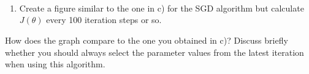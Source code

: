 \documentclass[11pt]{article}
\providecommand{\tightlist}{%
      \setlength{\itemsep}{0pt}\setlength{\parskip}{0pt}}
\begin{document}
    \begin{center}
    \end{center}
    { \hspace*{\fill} \\}
    
    \begin{center}
    \end{center}
    { \hspace*{\fill} \\}
    
    \begin{center}
    \end{center}
    { \hspace*{\fill} \\}
    
    \begin{enumerate}
\def\labelenumi{\alph{enumi})}
\setcounter{enumi}{3}
\tightlist
\item
  Create a figure similar to the one in c) for the SGD algorithm but
  calculate \(J(\theta)\) every 100 iteration steps or so.
\end{enumerate}

How does the graph compare to the one you obtained in c)? Discuss
briefly whether you should always select the parameter values from the
latest iteration when using this algorithm.
\end{document}
